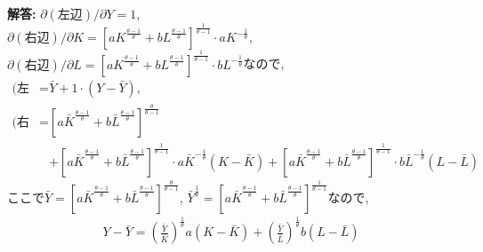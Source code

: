 \documentclass[a4paper,12pt,onecolumn,oneside,notitlepage,final]{article}
\begin{document}
\begin{enumerate}
{\bf 解答:} $\partial (\text{左辺})/\partial Y = 1$,\\
$\partial (\text{右辺})/\partial K = [a K^\frac{\theta -1}{\theta} + b L^\frac{\theta -1}{\theta}]^{\frac{1}{\theta -1}}\cdot a K^{-\frac{1}{\theta}}$,\\
$\partial (\text{右辺})/\partial L = [a K^\frac{\theta -1}{\theta} + b L^\frac{\theta -1}{\theta}]^{\frac{1}{\theta -1}}\cdot b L^{-\frac{1}{\theta}}$なので,
\begin{align*}
\text{(左辺)} = &\bar Y + 1\cdot (Y - \bar Y),\\
\text{(右辺)} = &[a \bar K^\frac{\theta -1}{\theta} + b \bar L^\frac{\theta -1}{\theta}]^{\frac{\theta}{\theta -1}} \\ &+ [a \bar K^\frac{\theta -1}{\theta} + b \bar L^\frac{\theta -1}{\theta}]^{\frac{1}{\theta -1}}\cdot a \bar K^{-\frac{1}{\theta}} (K - \bar K) + [a \bar K^\frac{\theta -1}{\theta} + b \bar L^\frac{\theta -1}{\theta}]^{\frac{1}{\theta -1}}\cdot b \bar L^{-\frac{1}{\theta}} (L - \bar L)
\end{align*}
ここで$\bar Y = [a \bar K^\frac{\theta -1}{\theta} + b \bar L^\frac{\theta -1}{\theta}]^{\frac{\theta}{\theta -1}}$, $\bar Y^\frac{1}{\theta} = [a \bar K^\frac{\theta -1}{\theta} + b \bar L^\frac{\theta -1}{\theta}]^{\frac{1}{\theta -1}}$なので,
\begin{align*}
Y - \bar Y = \left(\frac{\bar Y}{\bar K}\right)^\frac{1}{\theta}a (K-\bar K) + \left(\frac{\bar Y}{\bar L}\right)^\frac{1}{\theta}b (L-\bar L)
\end{align*}
\end{enumerate}
\end{document}
